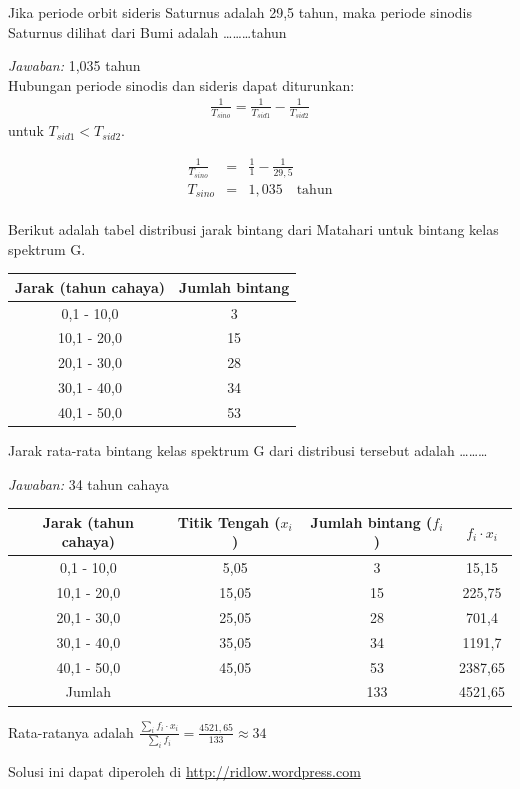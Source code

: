 \documentclass[11pt,fleqn]{exam}
\begin{document}
\begin{questions}
\question Jika periode orbit sideris Saturnus adalah 29,5 tahun, maka periode sinodis Saturnus dilihat dari Bumi adalah \ldots\ldots\ldots tahun

\textit{Jawaban: } 1,035 tahun\\

Hubungan periode sinodis dan sideris dapat diturunkan:
\begin{eqnarray*}
\frac{1}{T_{sino}} = \frac{1}{T_{sid1}} - \frac{1}{T_{sid2}}
\end{eqnarray*}
untuk $T_{sid1} < T_{sid2}$. 

\begin{eqnarray*}
\frac{1}{T_{sino}} &=& \frac{1}{1} - \frac{1}{29,5}\\
T_{sino} &=& 1,035 \quad \text{tahun}
\end{eqnarray*}\\


\question Berikut adalah tabel distribusi jarak bintang dari Matahari untuk bintang kelas spektrum G.


\begin{center}
\begin{tabular}{|c|c|}
\hline 
Jarak (tahun  cahaya) & Jumlah bintang \\ 
\hline 
0,1 - 10,0 & 3 \\ 
\hline 
10,1 - 20,0 & 15 \\ 
\hline 
20,1 - 30,0 & 28 \\ 
\hline 
30,1 - 40,0 & 34 \\ 
\hline 
40,1 - 50,0 & 53 \\ 
\hline 
\end{tabular} 
\end{center}

Jarak rata-rata bintang kelas spektrum G dari distribusi tersebut adalah \ldots\ldots\ldots

\textit{Jawaban: } 34 tahun cahaya\\

\begin{center}
\begin{tabular}{|c|c|c|c|}
\hline 
Jarak (tahun  cahaya) & Titik Tengah ($x_i$) & Jumlah bintang ($f_i$) & $f_i \cdot x_i$ \\ 
\hline 
0,1 - 10,0 & 5,05 & 3 & 15,15\\ 
\hline 
10,1 - 20,0 & 15,05 & 15 & 225,75\\ 
\hline 
20,1 - 30,0 & 25,05 & 28 & 701,4\\ 
\hline 
30,1 - 40,0 & 35,05 & 34 & 1191,7\\ 
\hline 
40,1 - 50,0 & 45,05 & 53 & 2387,65\\ 
\hline 
Jumlah & & 133 & 4521,65\\
\hline
\end{tabular} 
\end{center}

Rata-ratanya adalah $\frac{\sum_i f_i \cdot x_i}{\sum_i f_i} = \frac{4521,65}{133} \approx 34$

\end{questions}


\vspace{5cm}
\begin{flushright}
Solusi ini dapat diperoleh di \url{http://ridlow.wordpress.com}
\end{flushright}
\end{document}
